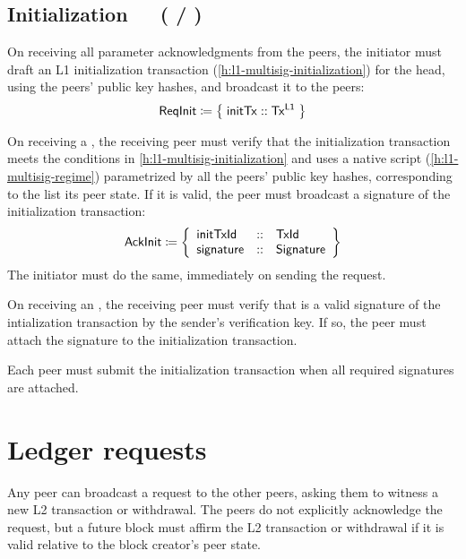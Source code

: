 \documentclass[../hydrozoa.tex]{subfiles}
\begin{document}
\subsection{Initialization~~~( / )}%
\label{h:l2-consensus-intitialization}%

On receiving all parameter acknowledgments from the peers, the initiator must draft an L1 initialization transaction (\cref{h:l1-multisig-initialization}) for the head, using the peers' public key hashes, and broadcast it to the peers:
\begin{equation*}
  \mathsf{ReqInit} \coloneq \;\bigr\{\; \mathsf{initTx} :: \mathsf{Tx^{L1}} \;\bigr\}
\end{equation*}

On receiving a , the receiving peer must verify that the initialization transaction meets the conditions in \cref{h:l1-multisig-initialization} and uses a native script (\cref{h:l1-multisig-regime}) parametrized by all the peers' public key hashes, corresponding to the  list its peer state.
If it is valid, the peer must broadcast a signature of the initialization transaction:
\begin{equation*}
  \mathsf{AckInit} \coloneq \left\{
  \begin{array}{lll}
    \mathsf{initTxId} &::& \mathsf{TxId} \\
    \mathsf{signature} &::& \mathsf{Signature}
  \end{array}\right\}
\end{equation*}
The initiator must do the same, immediately on sending the  request.

On receiving an , the receiving peer must verify that  is a valid signature of the intialization transaction by the sender's verification key.
If so, the peer must attach the signature to the initialization transaction.

Each peer must submit the initialization transaction when all required signatures are attached.

\section{Ledger requests}%
\label{h:l2-consensus-ledger}%

Any peer can broadcast a request to the other peers, asking them to witness a new L2 transaction or withdrawal.
The peers do not explicitly acknowledge the request, but a future block must affirm the L2 transaction or withdrawal if it is valid relative to the block creator's peer state.
\end{document}
